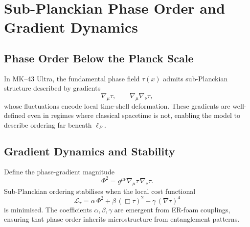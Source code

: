 \chapter{Sub-Planckian Phase Order and Gradient Dynamics}

\section{Phase Order Below the Planck Scale}

In MK--43 Ultra, the fundamental phase field $\tau(x)$ admits sub-Planckian structure described by gradients
\[
\nabla_\mu \tau,\qquad \nabla_\mu \nabla_\nu \tau,
\]
whose fluctuations encode local time-shell deformation.
These gradients are well-defined even in regimes where classical spacetime is not, enabling the model to describe ordering far beneath $\ell_P$.

\section{Gradient Dynamics and Stability}

Define the phase-gradient magnitude
\[
\Phi^2 = g^{\mu\nu} \nabla_\mu \tau\, \nabla_\nu \tau.
\]
Sub-Planckian ordering stabilises when the local cost functional
\[
\mathcal{L}_\tau = \alpha\, \Phi^2 + \beta\, (\Box \tau)^2 + \gamma\, (\nabla \tau)^4
\]
is minimised.
The coefficients $\alpha,\beta,\gamma$ are emergent from ER-foam couplings, ensuring that phase order inherits microstructure from entanglement patterns.


